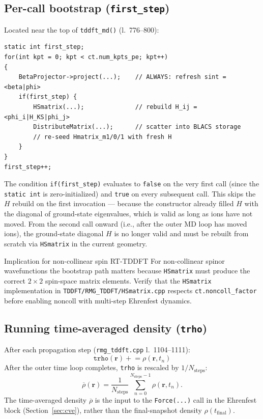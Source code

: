 \documentclass[11pt,letterpaper]{article}
\begin{document}
\subsection{Per-call bootstrap (\texttt{first\_step})}
\label{sec:bootstrap}

Located near the top of \texttt{tddft\_md()} (l.~776--800):
\begin{lstlisting}[style=cppstyle]
static int first_step;
for(int kpt = 0; kpt < ct.num_kpts_pe; kpt++)
{
    BetaProjector->project(...);    // ALWAYS: refresh sint = <beta|phi>
    if(first_step) {
        HSmatrix(...);              // rebuild H_ij = <phi_i|H_KS|phi_j>
        DistributeMatrix(...);      // scatter into BLACS storage
        // re-seed Hmatrix_m1/0/1 with fresh H
    }
}
first_step++;
\end{lstlisting}

The condition \texttt{if(first\_step)} evaluates to \texttt{false} on the
very first call (since the \texttt{static int} is zero-initialized) and
\texttt{true} on every subsequent call.  This skips the $H$ rebuild on the
first invocation --- because the constructor already filled $H$ with the
diagonal of ground-state eigenvalues, which is valid as long as ions have
not moved.  From the second call onward (i.e., after the outer MD loop
has moved ions), the ground-state diagonal $H$ is no longer valid and
must be rebuilt from scratch via \texttt{HSmatrix} in the current geometry.

\begin{infobox}{Implication for non-collinear spin RT-TDDFT}
For non-collinear spinor wavefunctions the bootstrap path matters because
\texttt{HSmatrix} must produce the correct $2\times 2$ spin-space matrix
elements.  Verify that the \texttt{HSmatrix} implementation in
\texttt{TDDFT/RMG\_TDDFT/HSmatrix.cpp} respects \texttt{ct.noncoll\_factor}
before enabling noncoll with multi-step Ehrenfest dynamics.
\end{infobox}

\subsection{Running time-averaged density (\texttt{trho})}
\label{sec:trho}

After each propagation step (\texttt{rmg\_tddft.cpp} l.~1104--1111):
\[
  \texttt{trho}(\mathbf{r}) \mathrel{+}= \rho(\mathbf{r}, t_n)
\]
After the outer time loop completes, \texttt{trho} is rescaled by
$1/N_\text{steps}$:
\[
  \overline{\rho}(\mathbf{r})
  = \frac{1}{N_\text{steps}}\sum_{n=0}^{N_\text{steps}-1} \rho(\mathbf{r},t_n).
\]
The time-averaged density $\overline\rho$ is the input to the
\texttt{Force(...)} call in the Ehrenfest block (Section~\ref{sec:cve}),
rather than the final-snapshot density $\rho(t_\text{final})$.
\end{document}
